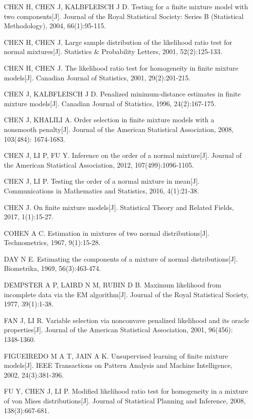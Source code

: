 \documentclass[a4paper,12pt,openany,oneside,utf-8]{ctexbook}
\begin{document}
\begin{enumerate}[{[}1{]}]
\item 	CHEN H, CHEN J, KALBFLEISCH J D. Testing for a finite mixture model with two components[J]. Journal of the Royal Statistical Society: Series B (Statistical Methodology), 2004, 66(1):95-115.
\item 	CHEN H, CHEN J. Large sample distribution of the likelihood ratio test for normal mixtures[J]. Statistics \& Probability Letters, 2001, 52(2):125-133.
\item 	CHEN H, CHEN J. The likelihood ratio test for homogeneity in finite mixture models[J]. Canadian Journal of Statistics, 2001, 29(2):201-215.
\item 	CHEN J, KALBFLEISCH J D. Penalized minimum‐distance estimates in finite mixture models[J]. Canadian Journal of Statistics, 1996, 24(2):167-175.
\item 	CHEN J, KHALILI A. Order selection in finite mixture models with a nonsmooth penalty[J]. Journal of the American Statistical Association, 2008, 103(484): 1674-1683.
\item 	CHEN J, LI P, FU Y. Inference on the order of a normal mixture[J]. Journal of the American Statistical Association, 2012, 107(499):1096-1105.
\item 	CHEN J, LI P. Testing the order of a normal mixture in mean[J]. Communications in Mathematics and Statistics, 2016, 4(1):21-38.
\item 	CHEN J. On finite mixture models[J]. Statistical Theory and Related Fields, 2017, 1(1):15-27.
\item 	COHEN A C. Estimation in mixtures of two normal distributions[J]. Technometrics, 1967, 9(1):15-28.
\item 	DAY N E. Estimating the components of a mixture of normal distributions[J]. Biometrika, 1969, 56(3):463-474.
\item 	DEMPSTER A P, LAIRD N M, RUBIN D B. Maximum likelihood from incomplete data via the EM algorithm[J]. Journal of the Royal Statistical Society, 1977, 39(1):1-38.
\item 	FAN J, LI R. Variable selection via nonconvave penalized likelihood and its oracle properties[J]. Journal of the American Statistical Association, 2001, 96(456): 1348-1360.
\item 	FIGUEIREDO M A T, JAIN A K. Unsupervised learning of finite mixture models[J]. IEEE Transactions on Pattern Analysis and Machine Intelligence, 2002, 24(3):381-396.
\item 	FU Y, CHEN J, LI P. Modified likelihood ratio test for homogeneity in a mixture of von Mises distributions[J]. Journal of Statistical Planning and Inference, 2008, 138(3):667-681.

\end{enumerate}
\end{document}
